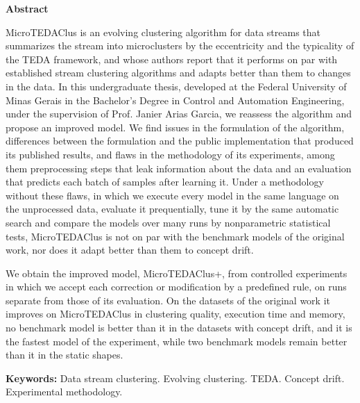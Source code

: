 
\begin{center}
\huge{{\bf Abstract}}
\vspace{1cm}
\end{center}

MicroTEDAClus is an evolving clustering algorithm for data streams that summarizes the stream into microclusters by the eccentricity and the typicality of the TEDA framework, and whose authors report that it performs on par with established stream clustering algorithms and adapts better than them to changes in the data. In this undergraduate thesis, developed at the Federal University of Minas Gerais in the Bachelor's Degree in Control and Automation Engineering, under the supervision of Prof. Janier Arias Garcia, we reassess the algorithm and propose an improved model. We find issues in the formulation of the algorithm, differences between the formulation and the public implementation that produced its published results, and flaws in the methodology of its experiments, among them preprocessing steps that leak information about the data and an evaluation that predicts each batch of samples after learning it. Under a methodology without these flaws, in which we execute every model in the same language on the unprocessed data, evaluate it prequentially, tune it by the same automatic search and compare the models over many runs by nonparametric statistical tests, MicroTEDAClus is not on par with the benchmark models of the original work, nor does it adapt better than them to concept drift.

We obtain the improved model, MicroTEDAClus+, from controlled experiments in which we accept each correction or modification by a predefined rule, on runs separate from those of its evaluation. On the datasets of the original work it improves on MicroTEDAClus in clustering quality, execution time and memory, no benchmark model is better than it in the datasets with concept drift, and it is the fastest model of the experiment, while two benchmark models remain better than it in the static shapes.

\noindent\textbf{Keywords:} Data stream clustering. Evolving clustering. TEDA. Concept drift. Experimental methodology.

\clearpage
\thispagestyle{empty}
\cleardoublepage

